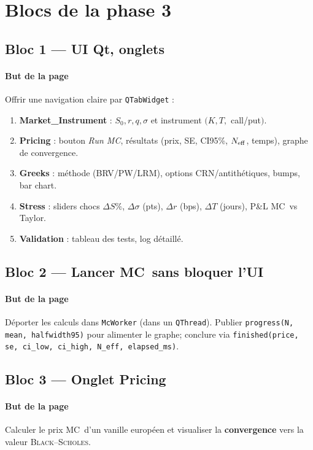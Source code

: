\documentclass[11pt,a4paper]{article}
\newcommand{\code}[1]{\texttt{#1}}
\newcommand{\bs}{\textsc{Black--Scholes}}
\newcommand{\ci}{\textsc{CI95}\%}
\newcommand{\mc}{\textsc{MC}}
\begin{document}
\section{Blocs de la phase 3}

\subsection*{Bloc 1 — UI Qt, onglets}
\paragraph{But de la page} Offrir une navigation claire par \code{QTabWidget} :
\begin{enumerate}[leftmargin=*]
  \item \textbf{Market\_Instrument} : $S_0, r, q, \sigma$ et instrument $(K,T,$ call/put$)$.
  \item \textbf{Pricing} : bouton \emph{Run MC}, résultats (prix, SE, \ci, \(N_{\rm eff}\), temps), graphe de convergence.
  \item \textbf{Greeks} : méthode (BRV/PW/LRM), options CRN/antithétiques, bumps, bar chart.
  \item \textbf{Stress} : sliders chocs \(\Delta S\%\), \(\Delta\sigma\) (pts), \(\Delta r\) (bps), \(\Delta T\) (jours), P\&L \mc\ vs Taylor.
  \item \textbf{Validation} : tableau des tests, log détaillé.
\end{enumerate}

\subsection*{Bloc 2 — Lancer \mc\ sans bloquer l’UI}
\paragraph{But de la page} Déporter les calculs dans \code{McWorker} (dans un \code{QThread}). Publier \code{progress(N, mean, halfwidth95)} pour alimenter le graphe; conclure via \code{finished(price, se, ci\_low, ci\_high, N\_eff, elapsed\_ms)}.

\subsection*{Bloc 3 — Onglet Pricing}
\paragraph{But de la page} Calculer le prix \mc\ d’un vanille européen et visualiser la \textbf{convergence} vers la valeur \bs.
\end{document}

